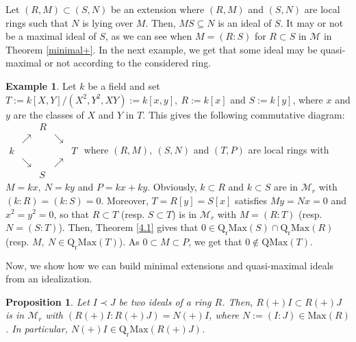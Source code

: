 \documentclass[12pt,leqno]{amsart}
\newtheorem{proposition}[theorem]{Proposition}
\theoremstyle{definition}
\newtheorem{example}[theorem]{Example}
\begin{document}
Let $(R,M)\subset (S,N)$ be an extension where $(R,M)$ and $(S,N)$ are local rings such that $N$ is lying over $M$. Then, $MS\subseteq N$ is an ideal of $S$. It may or not be a maximal ideal of $S$, as we can see when $M=(R:S)$ for $R\subset S$ in $\mathcal M$ in Theorem \ref{minimal+}. In the next example, we get that some ideal may be quasi-maximal or not according to the  considered ring.

\begin{example}\label{4.22} Let $k$ be a field and set $T:=k[X,Y]/(X^2,Y^ 2,XY):=k[x,y],\ R:=k[x]$ and $S:=k[y]$, where $x$ and $y$ are the classes of $X$ and $Y$ in $T$. This gives the following commutative diagram:
$\begin{matrix}
{} &       {}       & R  &       {}      & {}  \\
{} & \nearrow & {}  & \searrow & {}   \\
k &      {}        & {}  &       {}       & T   \\
{} & \searrow & {}  & \nearrow & {}   \\ 
{} &     {}        & S  &       {}       & {}
\end{matrix}$
where $(R,M),\ (S,N)$ and $(T,P)$ are local rings with $M=kx,\ N=ky$ and $P=kx+ky$. Obviously, $k\subset R$ and $k\subset S$ are in $\mathcal M _r$ with $(k:R)=(k:S)=0$. Moreover, $T=R[y]=S[x]$ satisfies $My=Nx=0$ and $x^2=y^2=0$, so that $R\subset T$ (resp. $S\subset T$) is in $\mathcal M_r$ with $M=(R:T)$ (resp. $N= (S:T)$). Then, Theorem \ref{4.1} gives that $0\in\mathrm{Q_rMax}(S)\cap\mathrm{Q_rMax}(R)$ (resp. $M,\ N\in\mathrm{Q_rMax}(T)$). As $0\subset M\subset P$, we get that $0\not\in\mathrm{QMax}(T)$.
\end{example}

Now, we show how we can build minimal extensions and quasi-maximal ideals from an idealization.  

\begin{proposition}\label{4.21} Let $I\prec J$ be two ideals of a ring $R$. 
Then, $R(+)I\subset R(+)J$ is in $\mathcal M_r$ with $(R(+)I:R(+)J)=N(+)I$, where $N:=(I:J)\in\mathrm{Max}(R)$. In particular, $N(+)I\in\mathrm {Q_rMax}( R(+)J)$. 
\end{proposition}
\end{document}
